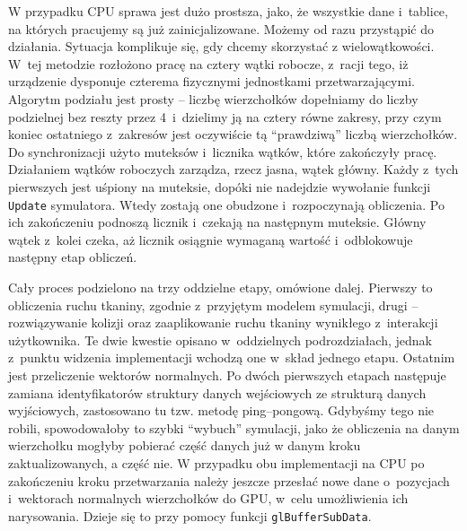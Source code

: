		W przypadku CPU sprawa jest dużo prostsza, jako, że wszystkie dane i~tablice, na których pracujemy są już zainicjalizowane. Możemy od razu przystąpić do działania. Sytuacja komplikuje się, gdy chcemy skorzystać z wielowątkowości. W~tej metodzie rozłożono pracę na cztery wątki robocze, z~racji tego, iż urządzenie dysponuje czterema fizycznymi jednostkami przetwarzającymi. Algorytm podziału jest prosty -- liczbę wierzchołków dopełniamy do liczby podzielnej bez reszty przez 4~i~dzielimy ją na cztery równe zakresy, przy czym koniec ostatniego z~zakresów jest oczywiście tą ``prawdziwą'' liczbą wierzchołków. Do synchronizacji użyto muteksów i~licznika wątków, które zakończyły pracę. Działaniem wątków roboczych zarządza, rzecz jasna, wątek główny. Każdy z~tych pierwszych jest uśpiony na muteksie, dopóki nie nadejdzie wywołanie funkcji \texttt{Update} symulatora. Wtedy zostają one obudzone i~rozpoczynają obliczenia. Po ich zakończeniu podnoszą licznik i~czekają na następnym muteksie. Główny wątek z~kolei czeka, aż licznik osiągnie wymaganą wartość i~odblokowuje następny etap obliczeń.
		
		Cały proces podzielono na trzy oddzielne etapy, omówione dalej. Pierwszy to obliczenia ruchu tkaniny, zgodnie z~przyjętym modelem symulacji, drugi -- rozwiązywanie kolizji oraz zaaplikowanie ruchu tkaniny wynikłego z~interakcji użytkownika. Te dwie kwestie opisano w~oddzielnych podrozdziałach, jednak z~punktu widzenia implementacji wchodzą one w~skład jednego etapu. Ostatnim jest przeliczenie wektorów normalnych. Po dwóch pierwszych etapach następuje zamiana identyfikatorów struktury danych wejściowych ze strukturą danych wyjściowych, zastosowano tu tzw. metodę ping--pongową. Gdybyśmy tego nie robili, spowodowałoby to szybki ``wybuch'' symulacji, jako że obliczenia na danym wierzchołku mogłyby pobierać część danych już w danym kroku zaktualizowanych, a część nie. W przypadku obu implementacji na CPU po zakończeniu kroku przetwarzania należy jeszcze przesłać nowe dane o~pozycjach i~wektorach normalnych wierzchołków do GPU, w~celu umożliwienia ich narysowania. Dzieje się to przy pomocy funkcji \texttt{glBufferSubData}.
		
